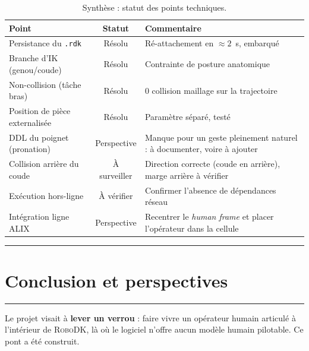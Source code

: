 \documentclass[12pt]{article}
\newcommand{\barre}{\noindent\textcolor{supmerange}{\rule{\textwidth}{3pt}}}
\newcommand{\rsection}[1]{%
  \barre\par\vspace{2pt}%
  \section{#1}%
  \vspace{-6pt}\barre\par\vspace{0.7em}}
\begin{document}
\begin{table}[H]
\centering
\caption{Synthèse : statut des points techniques.}
\label{tab:statut}
\small
\begin{tabularx}{\textwidth}{@{}p{5.2cm}cX@{}}
\toprule
\textbf{Point} & \textbf{Statut} & \textbf{Commentaire} \\
\midrule
Persistance du \texttt{.rdk} & \textcolor{supmerange}{Résolu} & Ré-attachement en $\approx 2$~s, embarqué \\
Branche d'IK (genou/coude) & \textcolor{supmerange}{Résolu} & Contrainte de posture anatomique \\
Non-collision (tâche bras) & \textcolor{supmerange}{Résolu} & 0 collision maillage sur la trajectoire \\
Position de pièce externalisée & \textcolor{supmerange}{Résolu} & Paramètre séparé, testé \\
DDL du poignet (pronation) & Perspective & Manque pour un geste pleinement naturel : à documenter, voire à ajouter \\
Collision arrière du coude & À surveiller & Direction correcte (coude en arrière), marge arrière à vérifier \\
Exécution hors-ligne & À vérifier & Confirmer l'absence de dépendances réseau \\
Intégration ligne ALIX & Perspective & Recentrer le \emph{human frame} et placer l'opérateur dans la cellule \\
\bottomrule
\end{tabularx}
\end{table}


\rsection{Conclusion et perspectives}
\label{sec:conclusion}

Le projet visait à \textbf{lever un verrou} : faire vivre un opérateur humain
articulé à l'intérieur de \textsc{RoboDK}, là où le logiciel n'offre aucun modèle
humain pilotable. Ce pont a été construit.
\end{document}
